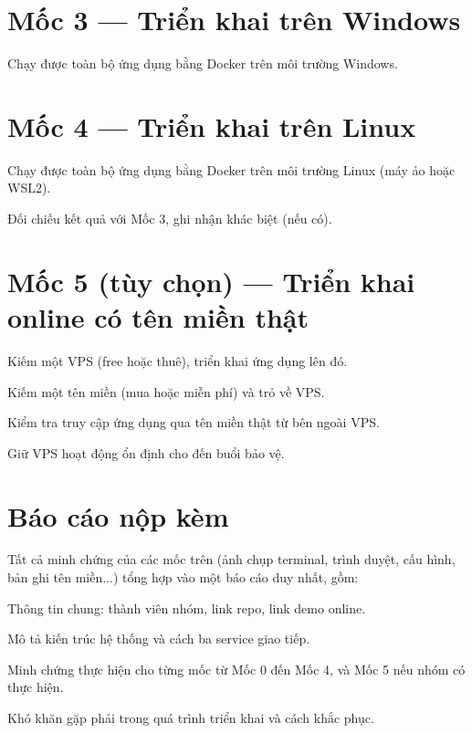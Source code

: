 \documentclass[a4paper,11pt]{article}
\begin{document}
\section{Mốc 3 — Triển khai trên Windows}

\begin{checklist}
  \item Chạy được toàn bộ ứng dụng bằng Docker trên môi trường Windows.
\end{checklist}

\section{Mốc 4 — Triển khai trên Linux}

\begin{checklist}
  \item Chạy được toàn bộ ứng dụng bằng Docker trên môi trường Linux (máy ảo hoặc WSL2).
  \item Đối chiếu kết quả với Mốc 3, ghi nhận khác biệt (nếu có).
\end{checklist}

\section{Mốc 5 (tùy chọn) — Triển khai online có tên miền thật}

\begin{checklist}
  \item Kiếm một VPS (free hoặc thuê), triển khai ứng dụng lên đó.
  \item Kiếm một tên miền (mua hoặc miễn phí) và trỏ về VPS.
  \item Kiểm tra truy cập ứng dụng qua tên miền thật từ bên ngoài VPS.
  \item Giữ VPS hoạt động ổn định cho đến buổi bảo vệ.
\end{checklist}

\section{Báo cáo nộp kèm}

Tất cả minh chứng của các mốc trên (ảnh chụp terminal, trình duyệt, cấu hình, bản ghi tên miền...) tổng hợp vào một báo cáo duy nhất, gồm:

\begin{checklist}
  \item Thông tin chung: thành viên nhóm, link repo, link demo online.
  \item Mô tả kiến trúc hệ thống và cách ba service giao tiếp.
  \item Minh chứng thực hiện cho từng mốc từ Mốc 0 đến Mốc 4, và Mốc 5 nếu nhóm có thực hiện.
  \item Khó khăn gặp phải trong quá trình triển khai và cách khắc phục.
\end{checklist}
\end{document}
